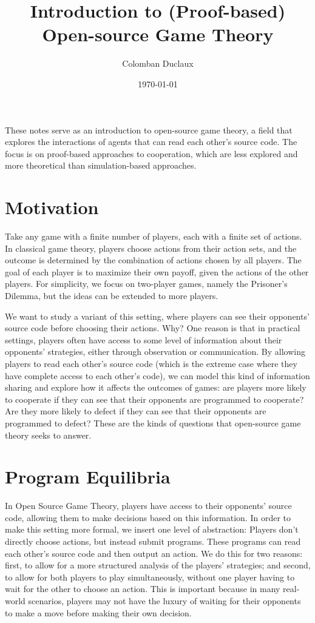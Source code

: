\documentclass{article}
\title{Introduction to (Proof-based) Open-source Game Theory}
\author{Colomban Duclaux}
\date{\today}
\begin{document}
\maketitle

These notes serve as an introduction to open-source game theory, a field that explores the interactions of agents that can read each other's source code. The focus is on proof-based approaches to cooperation, which are less explored and more theoretical than simulation-based approaches.

\section{Motivation}
Take any game with a finite number of players, each with a finite set of actions. In classical game theory, players choose actions from their action sets, and the outcome is determined by the combination of actions chosen by all players. The goal of each player is to maximize their own payoff, given the actions of the other players. For simplicity, we focus on two-player games, namely the Prisoner's Dilemma, but the ideas can be extended to more players.

We want to study a variant of this setting, where players can see their opponents' source code before choosing their actions. Why? One reason is that in practical settings, players often have access to some level of information about their opponents' strategies, either through observation or communication. By allowing players to read each other's source code (which is the extreme case where they have complete access to each other's code), we can model this kind of information sharing and explore how it affects the outcomes of games: are players more likely to cooperate if they can see that their opponents are programmed to cooperate? Are they more likely to defect if they can see that their opponents are programmed to defect? These are the kinds of questions that open-source game theory seeks to answer.

\section{Program Equilibria}
In Open Source Game Theory, players have access to their opponents' source code, allowing them to make decisions based on this information. In order to make this setting more formal, we insert one level of abstraction: Players don't directly choose actions, but instead submit programs. These programs can read each other's source code and then output an action. We do this for two reasons: first, to allow for a more structured analysis of the players' strategies; and second, to allow for both players to play simultaneously, without one player having to wait for the other to choose an action. This is important because in many real-world scenarios, players may not have the luxury of waiting for their opponents to make a move before making their own decision.
\end{document}
